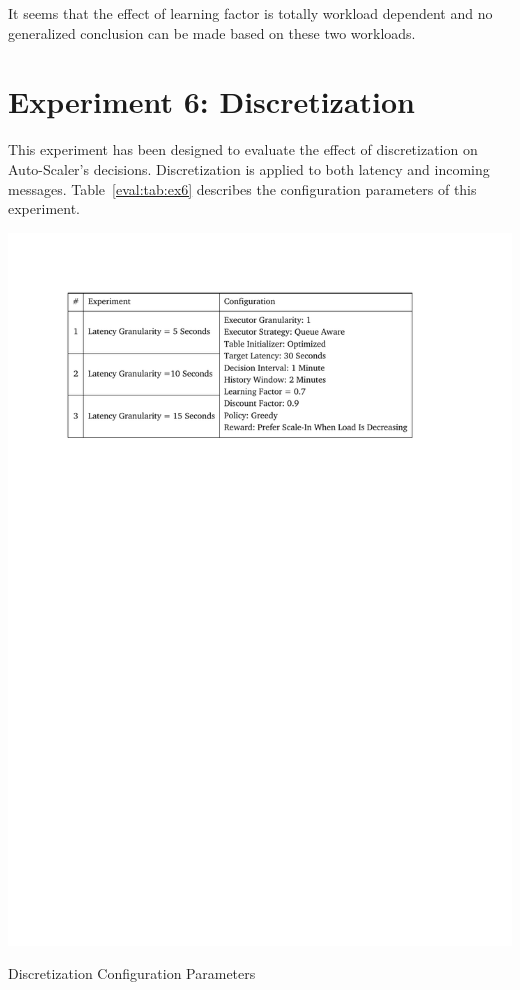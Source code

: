 It seems that the effect of learning factor is totally workload dependent and no generalized conclusion can be made based on these two workloads.
\clearpage
\section{Experiment 6: Discretization}
This experiment has been designed to evaluate the effect of discretization on Auto-Scaler's decisions. Discretization is applied to both latency and incoming messages. Table~\ref{eval:tab:ex6} describes the configuration parameters of this experiment.
\begin{table}[h]
    \includegraphics[clip,trim=2.2cm 21.18cm 3cm 2.5cm]{tables/ex6.pdf}
    \centering
    \caption{Discretization Configuration Parameters}
    \label{eval:tab:ex6}
\end{table}

